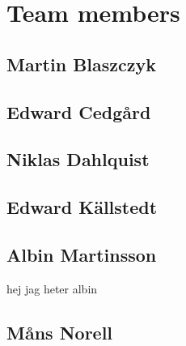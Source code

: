 \section{Team members}

\subsection{Martin Blaszczyk}

\subsection{Edward Cedgård}

\subsection{Niklas Dahlquist}

\subsection{Edward Källstedt}

\subsection{Albin Martinsson} hej jag heter albin

\subsection{Måns Norell}










